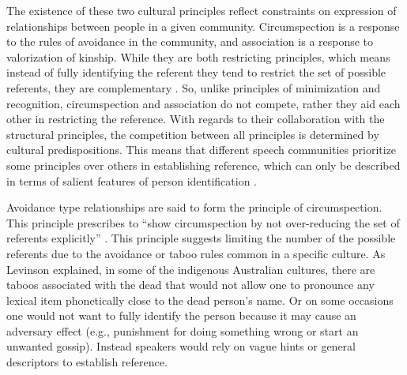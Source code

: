 \documentclass[12pt]{article}
\begin{document}
The existence of these two cultural principles reflect constraints on expression of relationships between people in a given community. Circumspection is a response to the rules of avoidance in the community, and association is a response to valorization of kinship. While they are both restricting principles, which means instead of fully identifying the referent they tend to restrict the set of possible referents, they are complementary \parencite{blythe2009}. So, unlike principles of minimization and recognition, circumspection and association do not compete, rather they aid each other in restricting the reference. With regards to their collaboration with the structural principles, the competition between all principles is determined by cultural predispositions. This means that different speech communities prioritize some principles over others in establishing reference, which can only be described in terms of salient features of person identification \parencite{enfield2013a}. 

Avoidance type relationships are said to form the principle of circumspection. This principle prescribes to ``show circumspection by not over-reducing the set of referents explicitly'' \parencite[p. 31]{levinson2007}. This principle suggests limiting the number of the possible referents due to the avoidance or taboo rules common in a specific culture. As Levinson explained, in some of the indigenous Australian cultures, there are taboos associated with the dead that would not allow one to pronounce any lexical item phonetically close to the dead person's name. Or on some occasions one would not want to fully identify the person because it may cause an adversary effect (e.g., punishment for doing something wrong or start an unwanted gossip). Instead speakers would rely on vague hints or general descriptors to establish reference. 
\end{document}
